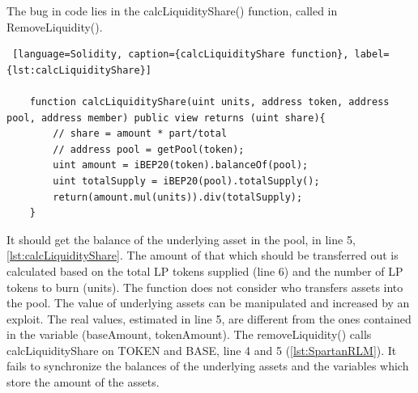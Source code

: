 The bug in code lies in the calcLiquidityShare() function, called in RemoveLiquidity(). 
\begin{lstlisting} [language=Solidity, caption={calcLiquidityShare function}, label={lst:calcLiquidityShare}]

    function calcLiquidityShare(uint units, address token, address pool, address member) public view returns (uint share){
        // share = amount * part/total
        // address pool = getPool(token);
        uint amount = iBEP20(token).balanceOf(pool);
        uint totalSupply = iBEP20(pool).totalSupply();
        return(amount.mul(units)).div(totalSupply);
    }

\end{lstlisting}

It should get the balance of the underlying asset in the pool, in line 5, \autoref{lst:calcLiquidityShare}. 
The amount of that which should be transferred out is calculated based on the total LP tokens supplied (line 6) 
and the number of LP tokens to burn (units).
The function does not consider who transfers assets into the pool. The value of underlying assets can be manipulated and increased by an exploit. 
The real values, estimated in line 5, are different from the ones contained in the variable (baseAmount, tokenAmount).
The removeLiquidity() calls calcLiquidityShare on TOKEN and BASE, line 4 and 5 (\autoref{lst:SpartanRLM}). 
It fails to synchronize the balances of the underlying assets and the variables which store the amount of the assets.

